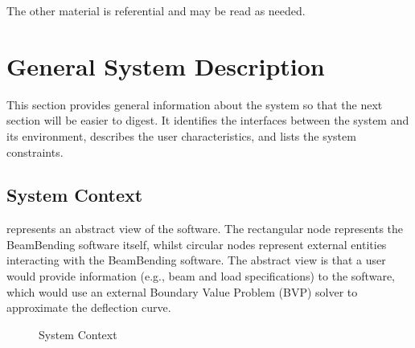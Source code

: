 \documentclass[12pt]{article}
\begin{document}
\noindent{}The other material is referential and may be read as needed.

\newpage


\section{General System Description}
\label{sec_gsd}

This section provides general information about the system so that the next
section will be easier to digest. It identifies the interfaces between the
system and its environment, describes the user characteristics, and lists the
system constraints.

\subsection{System Context}

 represents an abstract view of the software. The
rectangular node represents the BeamBending software itself, whilst circular
nodes represent external entities interacting with the BeamBending software. The
abstract view is that a user would provide information (e.g., beam and load
specifications) to the software, which would use an external Boundary Value
Problem (BVP) solver to approximate the deflection curve.

\begin{figure}[h!]
    \begin{center}
    \end{center}
    \caption{System Context}
    \label{Fig_SystemContext}
\end{figure}
\end{document}
